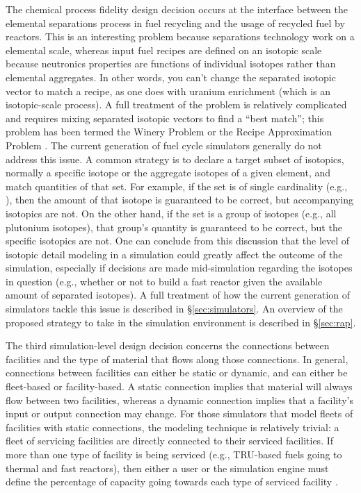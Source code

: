 The chemical process fidelity design decision occurs at the interface between
the elemental separations process in fuel recycling and the usage of recycled
fuel by reactors. This is an interesting problem because separations technology
work on a elemental scale, whereas input fuel recipes are defined on an isotopic
scale because neutronics properties are functions of individual isotopes rather
than elemental aggregates. In other words, you can't change the separated
isotopic vector to match a recipe, as one does with uranium enrichment (which is
an isotopic-scale process). A full treatment of the problem is relatively
complicated and requires mixing separated isotopic vectors to find a ``best
match''; this problem has been termed the Winery Problem or the Recipe
Approximation Problem \cite{oliver_geniusv2:_2009}. The current generation of
fuel cycle simulators generally do not address this issue. A common strategy is
to declare a target subset of isotopics, normally a specific isotope or the
aggregate isotopes of a given element, and match quantities of that set. For
example, if the set is of single cardinality (e.g., ), then the
amount of that isotope is guaranteed to be correct, but accompanying isotopics
are not. On the other hand, if the set is a group of isotopes (e.g., all
plutonium isotopes), that group's quantity is guaranteed to be correct, but the
specific isotopics are not. One can conclude from this discussion that the level
of isotopic detail modeling in a simulation could greatly affect the outcome of
the simulation, especially if decisions are made mid-simulation regarding the
isotopes in question (e.g., whether or not to build a fast reactor given the
available amount of separated isotopes). A full treatment of how the current
generation of simulators tackle this issue is described in
\S\ref{sec:simulators}. An overview of the proposed strategy to take in the
\Cyclus simulation environment is described in \S\ref{sec:rap}.

The third simulation-level design decision concerns the connections between
facilities and the type of material that flows along those connections. In
general, connections between facilities can either be static or dynamic, and can
either be fleet-based or facility-based. A static connection implies that
material will always flow between two facilities, whereas a dynamic connection
implies that a facility's input or output connection may change.  For those
simulators that model fleets of facilities with static connections, the modeling
technique is relatively trivial: a fleet of servicing facilities are directly
connected to their serviced facilities. If more than one type of facility is
being serviced (e.g., TRU-based fuels going to thermal and fast reactors), then
either a user or the simulation engine must define the percentage of capacity
going towards each type of serviced facility \cite{busquim_e_silva_system_2008}.

